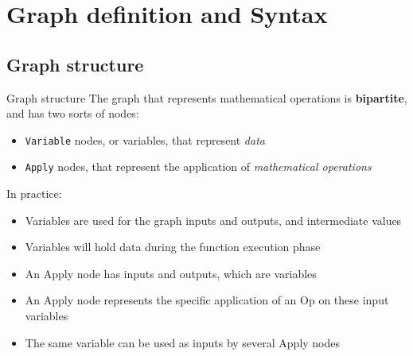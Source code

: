 \documentclass[a4paper,9pt]{beamer}
\begin{document}
%
%
%
%

\section{Graph definition and Syntax}
\begin{frame}
  \tableofcontents[currentsection]
\end{frame}

\subsection{Graph structure}
\begin{frame}[fragile]{Graph structure}
  The graph that represents mathematical operations is {\bf bipartite},
  and has two sorts of nodes:
  \begin{itemize}
    \item \verb|Variable| nodes, or variables, that represent {\em data}
    \item \verb|Apply| nodes, that represent the application of
      {\em mathematical operations}
  \end{itemize}
  In practice:
  \begin{itemize}
    \item Variables are used for the graph inputs and outputs, and intermediate values
    \item Variables will hold data during the function execution phase
    \item An Apply node has inputs and outputs, which are variables
    \item An Apply node represents the specific application of an Op on these input variables
    \item The same variable can be used as inputs by several Apply nodes
  \end{itemize}
\end{frame}
\end{document}
